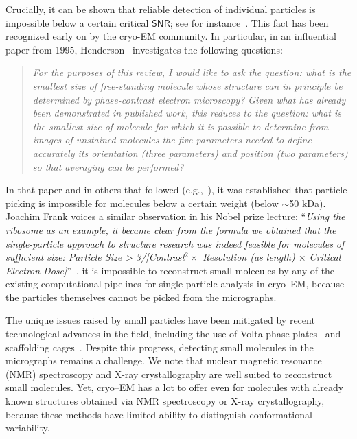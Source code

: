 \documentclass[english,11pt]{article}
\newcommand{\1}{\mathbf{1}}
\newcommand{\TODO}[1]{{\color{red}{[#1]}}}
\numberwithin{equation}{section}
\theoremstyle{plain}
\theoremstyle{definition}
\theoremstyle{remark}
\theoremstyle{plain}
\theoremstyle{remark}
\theoremstyle{plain}
\theoremstyle{plain}
\newcommand{\SNR}{\ensuremath{\textsf{SNR}}}
\begin{document}
Crucially, it can be shown that reliable detection of individual particles is impossible below a certain critical $\SNR$; see for instance~\cite{bendory2018estimation}\TODO{To verify the title}. This fact has been recognized early on by the cryo-EM community. In particular, in an influential paper from 1995, Henderson~\cite{henderson1995limitations} investigates the following questions:
\begin{quote}
	\emph{For the purposes of this review, I would like to ask the question: what is the smallest size of free-standing molecule whose structure can in principle be determined by phase-contrast electron microscopy? Given what has already been demonstrated in published work, this reduces to the question: what is the smallest size of molecule for which it is possible to determine from images of unstained molecules the five parameters needed to define accurately its orientation (three parameters) and position (two parameters) so that averaging can be performed?}
\end{quote}
In that paper and in others that followed (e.g.,~\cite{glaeser1999electron}), it was established that particle picking is impossible for molecules below a certain weight (below $\sim$50 kDa). 
Joachim Frank voices a similar observation in his Nobel prize lecture: ``\emph{Using the ribosome as an example, it became clear from the formula we obtained that the single-particle approach to structure research was indeed feasible for molecules of sufficient size: Particle Size > 3/[Contrast$^2\times $  Resolution (as length) $\times$ Critical Electron Dose]}''~\cite{frank2018single}. 
\TODO{As these two leaders of the cryo-EM community point out,} it is impossible to reconstruct small molecules by any of the existing computational pipelines for single particle analysis in cryo--EM, because the particles themselves cannot be picked from the micrographs.

The unique issues raised by small particles have been mitigated by recent technological advances in the field, including the use of Volta phase plates~\cite{khoshouei2017cryo,liang2017phase} and scaffolding cages~\cite{liu2018nearatomic}.
%
Despite this progress, detecting small molecules in the micrographs remains a challenge.
We note that nuclear magnetic resonance (NMR) spectroscopy and X-ray crystallography are well suited to reconstruct small molecules. Yet, cryo--EM has a lot to offer even for molecules with already known structures obtained via NMR spectroscopy or X-ray crystallography, because these methods have limited ability to distinguish conformational variability. \TODO{Need a ref for this claim.}
\end{document}
